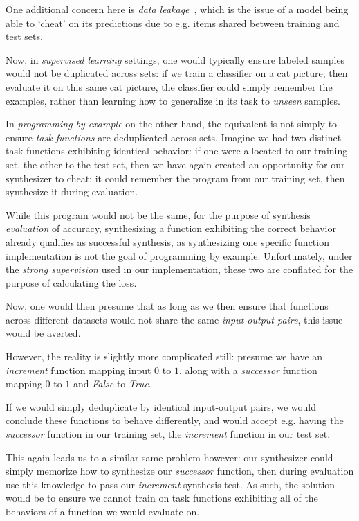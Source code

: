 \documentclass{article}
\begin{document}
One additional concern here is \emph{data leakage}~\citep{leakage},
which is the issue of a model being able to `cheat' on its predictions due to e.g. items shared between training and test sets.

Now, in \emph{supervised learning} settings,
one would typically ensure labeled samples would not be duplicated across sets:
if we train a classifier on a cat picture,
then evaluate it on this same cat picture,
the classifier could simply remember the examples,
rather than learning how to generalize in its task to \emph{unseen} samples.

In \emph{programming by example} on the other hand,
the equivalent is not simply to ensure \emph{task functions} are deduplicated across sets.
Imagine we had two distinct task functions exhibiting identical behavior:
if one were allocated to our training set,
the other to the test set,
then we have again created an opportunity for our synthesizer to cheat:
it could remember the program from our training set,
then synthesize it during evaluation.

While this program would not be the same,
for the purpose of synthesis \emph{evaluation} of accuracy,
synthesizing a function exhibiting the correct behavior already qualifies as successful synthesis,
as synthesizing one specific function implementation is not the goal of programming by example.%
    Unfortunately, under the \emph{strong supervision} used in our implementation,
    these two are conflated for the purpose of calculating the loss.

Now, one would then presume that as long as we then ensure
that functions across different datasets
would not share the same \emph{input-output pairs},
this issue would be averted.

However, the reality is slightly more complicated still:
presume we have an \emph{increment} function mapping input $0$ to $1$,
along with a \emph{successor} function mapping $0$ to $1$ and \emph{False} to \emph{True}.

If we would simply deduplicate by identical input-output pairs,
we would conclude these functions to behave differently,
and would accept e.g. having the \emph{successor} function in our training set,
the \emph{increment} function in our test set.

This again leads us to a similar same problem however:
our synthesizer could simply memorize how to synthesize our \emph{successor} function,
then during evaluation use this knowledge to pass our \emph{increment} synthesis test.
As such, the solution would be to ensure we cannot train on task functions exhibiting all of the behaviors of a function we would evaluate on.
\end{document}
